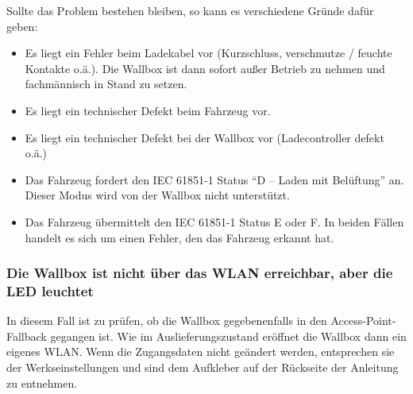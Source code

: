 \documentclass[a4paper,10pt]{article}
\begin{document}
\begin{multicols*}{2}
	Sollte das Problem bestehen bleiben, so kann es verschiedene Gründe dafür
	geben:
	\begin{itemize}
		\item Es liegt ein Fehler beim Ladekabel vor (Kurzschluss, verschmutze / feuchte
		      Kontakte o.ä.). Die Wallbox ist dann sofort außer Betrieb zu nehmen und
		      fachmännisch in Stand zu setzen.
		\item Es liegt ein technischer Defekt beim Fahrzeug vor.
		\item Es liegt ein technischer Defekt bei der Wallbox vor (Ladecontroller defekt o.ä.)
		\item Das Fahrzeug fordert den IEC 61851-1 Status \enquote{D – Laden mit Belüftung}
		      an. Dieser Modus wird von der Wallbox nicht unterstützt.
		\item Das Fahrzeug übermittelt den IEC 61851-1 Status E oder F. In beiden Fällen
		      handelt es sich um einen Fehler, den das Fahrzeug erkannt hat.
	\end{itemize}

	\subsubsection*{Die Wallbox ist nicht über das WLAN erreichbar, aber die LED leuchtet}
	In diesem Fall ist zu prüfen, ob die Wallbox gegebenenfalls in den Access-Point-Fallback
	gegangen ist. Wie im Auslieferungszustand eröffnet die Wallbox dann ein eigenes
	WLAN. Wenn die Zugangsdaten nicht geändert werden, entsprechen sie der Werkseinstellungen und sind dem
	Aufkleber auf der Rückseite der Anleitung zu entnehmen.


\end{multicols*}
\end{document}
